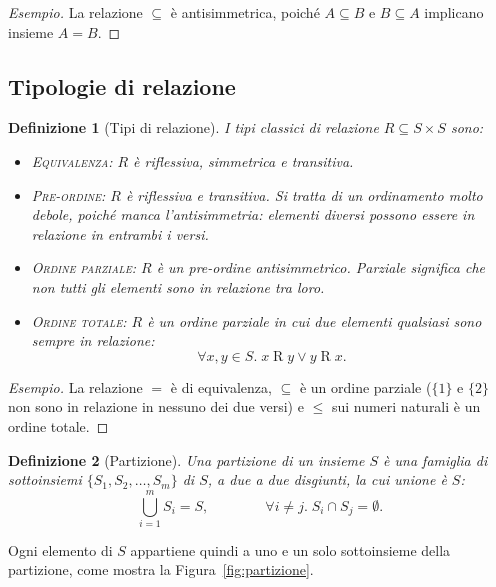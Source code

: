 \documentclass[a4paper, 11pt, oneside]{book}
\theoremstyle{formale}
\newtheorem*{definition}{Definizione}
\newenvironment{esempio}
    {\begin{proof}[\textit{Esempio}]\renewcommand{\qedsymbol}{$\diamond$}}
    {\end{proof}}
\begin{document}
    \begin{esempio}
        La relazione $\subseteq$ \`e antisimmetrica, poich\'e $A \subseteq B$ e
        $B \subseteq A$ implicano insieme $A = B$.
    \end{esempio}

    \subsection{Tipologie di relazione}
    \begin{definition}[Tipi di relazione]
        I tipi classici di relazione $R \subseteq S \times S$ sono:
        \begin{itemize}
            \item \textsc{Equivalenza}: $R$ \`e riflessiva, simmetrica e transitiva.
            \item \textsc{Pre-ordine}: $R$ \`e riflessiva e transitiva. Si tratta di un
                ordinamento molto debole, poich\'e manca l'antisimmetria: elementi diversi
                possono essere in relazione in entrambi i versi.
            \item \textsc{Ordine parziale}: $R$ \`e un pre-ordine antisimmetrico.
                \emph{Parziale} significa che non tutti gli elementi sono in relazione tra
                loro.
            \item \textsc{Ordine totale}: $R$ \`e un ordine parziale in cui due elementi
                qualsiasi sono sempre in relazione:
                \begin{equation*}
                    \forall x, y \in S.\; x \mathrel{R} y \lor y \mathrel{R} x.
                \end{equation*}
        \end{itemize}
    \end{definition}

    \begin{esempio}
        La relazione $=$ \`e di equivalenza, $\subseteq$ \`e un ordine parziale ($\{1\}$ e
        $\{2\}$ non sono in relazione in nessuno dei due versi) e $\leq$ sui numeri naturali
        \`e un ordine totale.
    \end{esempio}

    \begin{definition}[Partizione]
        Una \emph{partizione} di un insieme $S$ \`e una famiglia di sottoinsiemi
        $\{S_1, S_2, \dots, S_m\}$ di $S$, a due a due disgiunti, la cui unione \`e $S$:
        \begin{equation*}
            \bigcup_{i=1}^{m} S_i = S,
            \qquad\qquad
            \forall i \neq j.\; S_i \cap S_j = \emptyset.
        \end{equation*}
    \end{definition}
    Ogni elemento di $S$ appartiene quindi a uno e un solo sottoinsieme della partizione,
    come mostra la Figura~\ref{fig:partizione}.
\end{document}
